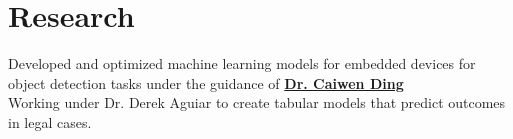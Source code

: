 \documentclass[]{resume-template}
\begin{document}
\begin{minipage}[t]{0.66\textwidth}



    \section{Research}\label{sec:research}
    \textbullet{} Developed and optimized machine learning models for embedded devices for object detection tasks under the guidance of \textbf{\href{https://caiwending.cse.uconn.edu/}{Dr. Caiwen Ding}} \\
    \textbullet{} Working under Dr. Derek Aguiar to create tabular models that predict outcomes in legal cases.




\end{minipage}
\end{document}
